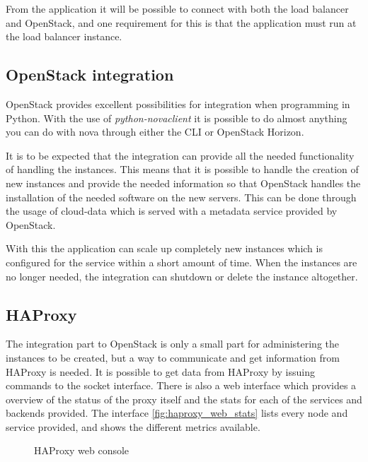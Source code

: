 From the application it will be possible to connect with both the load balancer
and OpenStack, and one requirement for this is that the application must run at
the load balancer instance.



\subsection{OpenStack integration}
OpenStack provides excellent possibilities for integration when programming in
Python. With the use of \textit{python-novaclient} \cite{OpenStackNovaClient} 
it is possible to do almost anything you can do with nova through either the 
CLI or OpenStack Horizon.

It is to be expected that the integration can provide all the needed
functionality of handling the instances. This means that it is possible to
handle the creation of new instances and provide the needed information so that
OpenStack handles the installation of the needed software on the new servers.
This can be done through the usage of cloud-data which is served with a
metadata service provided by OpenStack.

With this the application can scale up completely new instances which is
configured for the service within a short amount of time. When the instances
are no longer needed, the integration can shutdown or delete the instance
altogether.

\subsection{HAProxy}
The integration part to OpenStack is only a small part for administering the
instances to be created, but a way to communicate and get information from
HAProxy is needed. It is possible to get data from HAProxy by issuing commands
to the socket interface. There is also a web interface which provides a
overview of the status of the proxy itself and the stats for each of the
services and backends provided. The interface \vref{fig:haproxy_web_stats} lists
every node and service provided, and shows the different metrics available.

\begin{figure}[htp]
\centering
{}
\caption{\label{fig:haproxy_web_stats}HAProxy web console}
\end{figure}


